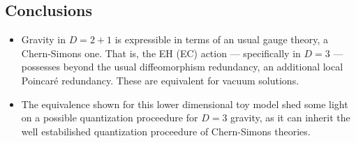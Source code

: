\documentclass[a0,portrait]{a0poster}
\begin{document}
\begin{multicols}{2}







\section*{Conclusions}

\begin{itemize}
    \item Gravity in $D=2+1$ is expressible in terms of an usual gauge theory, a Chern-Simons one. That is, the EH (EC) action --- specifically in $D=3$ --- possesses beyond the usual 
    diffeomorphism redundancy, an additional local Poincaré redundancy. These are equivalent for vacuum solutions. 

    \item The equivalence shown for this lower dimensional toy model shed some light on a possible quantization proceedure for $D=3$ gravity, 
    as it can inherit the well estabilished quantization proceedure of Chern-Simons theories.


\end{itemize}
\end{multicols}
\end{document}

